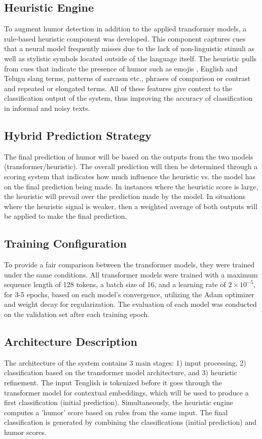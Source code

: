 \documentclass[conference]{IEEEtran}
\begin{document}
\subsection{Heuristic Engine}
To augment humor detection in addition to the applied transformer models, a rule-based heuristic component was developed. This component captures cues that a neural model frequently misses due to the lack of non-linguistic stimuli as well as stylistic symbols located outside of the language itself. The heuristic pulls from cues that indicate the presence of humor such as emojis , English and Telugu slang terms, patterns of sarcasm etc., phrases of comparison or contrast and repeated or elongated terms. All of these features give context to the classification output of the system, thus improving the accuracy of classification in informal and noisy texts.

\subsection{Hybrid Prediction Strategy}
The final prediction of humor will be based on the outputs from the two models (transformer/heuristic). The overall prediction will then be determined through a scoring system that indicates how much influence the heuristic vs. the model has on the final prediction being made. In instances where the heuristic score is large, the heuristic will prevail over the prediction made by the model. In situations where the heuristic signal is weaker, then a weighted average of both outputs will be applied to make the final prediction.

\subsection{Training Configuration}
To provide a fair comparison between the transformer models, they were trained under the same conditions. All transformer models were trained with a maximum sequence length of 128 tokens, a batch size of 16, and a learning rate of $2 \times 10^{-5}$, for 3-5 epochs, based on each model's convergence, utilizing the Adam optimizer and weight decay for regularization. The evaluation of each model was conducted on the validation set after each training epoch.

\subsection{Architecture Description}
The architecture of the system contains 3 main stages: 1) input processing, 2) classification based on the transformer model architecture, and 3) heuristic refinement. The input Tenglish is tokenized before it goes through the transformer model for contextual embeddings, which will be used to produce a first classification (initial prediction). Simultaneously, the heuristic engine computes a 'humor' score based on rules from the same input. The final classification is generated by combining the classifications (initial prediction) and humor scores.
\end{document}
